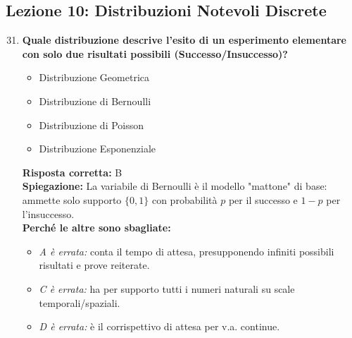 \documentclass[12pt, a4paper]{article}
\begin{document}
\subsection*{Lezione 10: Distribuzioni Notevoli Discrete}

\begin{enumerate}[label=\textbf{\arabic*.}]
\setcounter{enumi}{30}
    \item \textbf{Quale distribuzione descrive l'esito di un esperimento elementare con solo due risultati possibili (Successo/Insuccesso)?}
    \begin{itemize}
        \item[A)] Distribuzione Geometrica
        \item[B)] Distribuzione di Bernoulli
        \item[C)] Distribuzione di Poisson
        \item[D)] Distribuzione Esponenziale
    \end{itemize}
    \textbf{Risposta corretta:} B \\
    \textbf{Spiegazione:} La variabile di Bernoulli è il modello "mattone" di base: ammette solo supporto $\{0,1\}$ con probabilità $p$ per il successo e $1-p$ per l'insuccesso. \\
    \textbf{Perché le altre sono sbagliate:}
    \begin{itemize}
        \item \textit{A è errata:} conta il tempo di attesa, presupponendo infiniti possibili risultati e prove reiterate.
        \item \textit{C è errata:} ha per supporto tutti i numeri naturali su scale temporali/spaziali.
        \item \textit{D è errata:} è il corrispettivo di attesa per v.a. continue.
    \end{itemize}


\end{enumerate}
\end{document}
